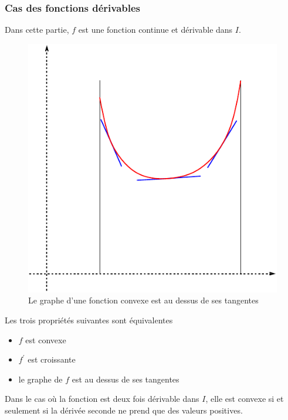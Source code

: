 \subsubsection{Cas des fonctions dérivables}
Dans cette partie, $f$ est une fonction continue et dérivable dans $I$.
\begin{figure}[ht]
 \centering
 \includegraphics{C2071_5.pdf}
 \caption{Le graphe d'une fonction convexe est au dessus de ses tangentes}
\end{figure}
\begin{prop}
 Les trois propriétés suivantes sont équivalentes
\begin{itemize}
 \item $f$ est convexe 
 \item $f^\prime$ est croissante
 \item le graphe de $f$ est au dessus de ses tangentes
\end{itemize}
\end{prop}
\begin{rem}
 Dans le cas où la fonction est deux fois dérivable dans $I$, elle est convexe si et seulement si la dérivée seconde ne prend que des valeurs positives.
\end{rem}
